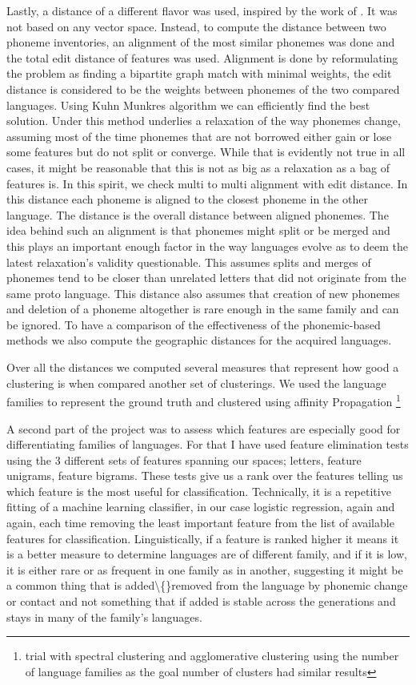 \documentclass[letterpaper, 11pt]{article}
\begin{document}
Lastly, a distance of a different flavor was used, inspired by the work of . It was not based on any vector space. Instead, to compute the distance between two phoneme inventories, an alignment of the most similar phonemes was done and the total edit distance of features was used. Alignment is done by reformulating the problem as finding a bipartite graph match with minimal weights, the edit distance is considered to be the weights between phonemes of the two compared languages. Using Kuhn Munkres algorithm we can efficiently find the best solution. Under this method underlies a relaxation of the way phonemes change, assuming most of the time phonemes that are not borrowed either gain or lose some features but do not split or converge. While that is evidently not true in all cases, it might be reasonable that this is not as big as a relaxation as a bag of features is.
In this spirit, we check multi to multi alignment with edit distance. In this distance each phoneme is aligned to the closest phoneme in the other language. The distance is the overall distance between aligned phonemes. The idea behind such an alignment is that phonemes might split or be merged and this plays an important enough factor in the way languages evolve as to deem the latest relaxation's validity questionable. This assumes splits and merges of phonemes tend to be closer than unrelated letters that did not originate from the same proto language. This distance also assumes that creation of new phonemes and deletion of a phoneme altogether is rare enough in the same family and can be ignored.
To have a comparison of the effectiveness of the phonemic-based methods we also compute the geographic distances for the acquired languages.

Over all the distances we computed several measures that represent how good a clustering is when compared another set of clusterings. We used the language families to represent the ground truth and clustered using affinity Propagation\cite{frey2007clustering} \footnote{trial with spectral clustering and agglomerative clustering using the number of language families as the goal number of clusters had similar results}

A second part of the project was to assess which features are especially good for differentiating families of languages. For that I have used feature elimination tests using the 3 different sets of features spanning our spaces; letters, feature unigrams, feature bigrams. These tests give us a rank over the features telling us which feature is the most useful for  classification. 
Technically, it is a repetitive fitting of a machine learning classifier, in our case logistic regression, again and again, each time removing the least important feature from the list of available features for classification. 
Linguistically, if a feature is ranked higher it means it is a better measure to determine languages are of different family, and if it is low, it is either rare or as frequent in one family as in another, suggesting it might be a common thing that is added\textbackslash\{\}removed from the language by phonemic change or contact and not something that if added is stable across the generations and stays in many of the family’s languages.
\end{document}
